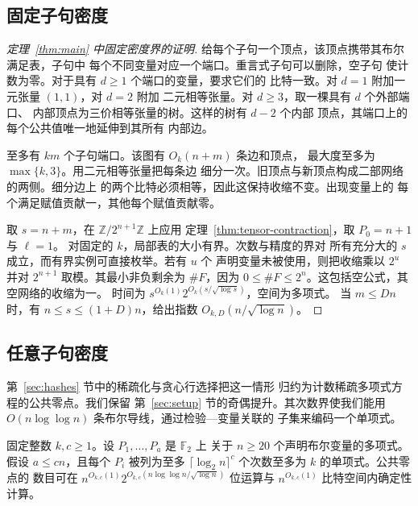 \subsection{固定子句密度}\label{subsec:sharp-fixed-density}

\begin{proof}[定理~\ref{thm:main} 中固定密度界的证明]
给每个子句一个顶点，该顶点携带其布尔满足表，子句中
每个不同变量对应一个端口。重言式子句可以删除，空子句
使计数为零。对于具有 $d\ge1$ 个端口的变量，要求它们的
比特一致。对 $d=1$ 附加一元张量 $(1,1)$，对 $d=2$ 附加
二元相等张量。对 $d\ge3$，取一棵具有 $d$ 个外部端口、
内部顶点为三价相等张量的树。这样的树有 $d-2$ 个内部
顶点，其端口上的每个公共值唯一地延伸到其所有
内部边。

至多有 $km$ 个子句端口。该图有 $O_k(n+m)$ 条边和顶点，
最大度至多为 $\max\{k,3\}$。用二元相等张量把每条边
细分一次。旧顶点与新顶点构成二部网络的两侧。细分边上
的两个比特必须相等，因此这保持收缩不变。出现变量上的
每个满足赋值贡献一，其他每个赋值贡献零。

取 $s=n+m$，在 $\mathbb Z/2^{n+1}\mathbb Z$ 上应用
定理~\ref{thm:tensor-contraction}，取 $P_0=n+1$ 与 $\ell=1$。
对固定的 $k$，局部表的大小有界。次数与精度的界对
所有充分大的 $s$ 成立，而有界实例可直接枚举。若有 $u$ 个
声明变量未被使用，则把收缩乘以 $2^u$ 并对
$2^{n+1}$ 取模。其最小非负剩余为 $\#F$，因为
$0\le\#F\le2^n$。这包括空公式，其空网络的收缩为一。
时间为 $s^{O_k(1)}2^{O_k(s/\sqrt{\log s})}$，空间为多项式。
当 $m\le Dn$ 时，有 $n\le s\le(1+D)n$，给出指数
$O_{k,D}(n/\sqrt{\log n})$。
\end{proof}

\subsection{任意子句密度}\label{subsec:sharp-dense}

第~\ref{sec:hashes} 节中的稀疏化与贪心行选择把这一情形
归约为计数稀疏多项式方程的公共零点。我们保留
第~\ref{sec:setup} 节的奇偶提升。其次数界使我们能用
$O(n\log\log n)$ 条布尔导线，通过检验—变量关联的
子集来编码一个单项式。

\begin{lemma}[通过收缩计数稀疏多项式系统]
\label{lem:tensor-sparse-query}
固定整数 $k,c\ge1$。设 $P_1,\ldots,P_a$ 是 $\mathbb F_2$ 上
关于 $n\ge20$ 个声明布尔变量的多项式。假设
$a\le cn$，且每个 $P_i$ 被列为至多
$\lceil\log_2 n\rceil^c$ 个次数至多为 $k$ 的单项式。公共零点的
数目可在 $n^{O_{k,c}(1)}2^{O_{k,c}(n\log\log n/\sqrt{\log n})}$
位运算与 $n^{O_{k,c}(1)}$ 比特空间内确定性计算。
\end{lemma}

